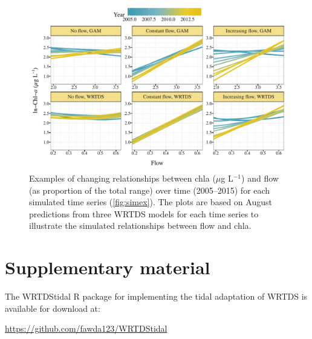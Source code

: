 \documentclass{svjour3}\usepackage[]{graphicx}\usepackage[]{color}
\makeatletter
\def\maxwidth{ %
  \ifdim\Gin@nat@width>\linewidth
    \linewidth
  \else
    \Gin@nat@width
  \fi
}
\newcommand{\mugl}{$\mu$g L$^{-1}$}
\newcommand{\beginsupplement}{%
        \setcounter{table}{0}
        \renewcommand{\thetable}{S\arabic{table}}%
        \setcounter{figure}{0}
        \renewcommand{\thefigure}{S\arabic{figure}}%
     }
\makeatother
\begin{document}
\begin{figure}[!ht]

{\centering \includegraphics[width=\maxwidth]{figs/dynasim-1} 

}

\caption{Examples of changing relationships between \ac{chla} (\mugl) and flow (as proportion of the total range) over time (2005--2015) for each simulated time series (\cref{fig:simex}).  The plots are based on August predictions from three \ac{WRTDS} models for each time series to illustrate the simulated relationships between flow and \ac{chla}.}\label{fig:dynasim}
\end{figure}



\clearpage
\section*{Supplementary material} \label{supp}

\beginsupplement

The WRTDStidal R package for implementing the tidal adaptation of \ac{WRTDS} is available for download at:\newline
\centerline{\href{https://github.com/fawda123/WRTDStidal}{https://github.com/fawda123/WRTDStidal}}\newline
\end{document}

